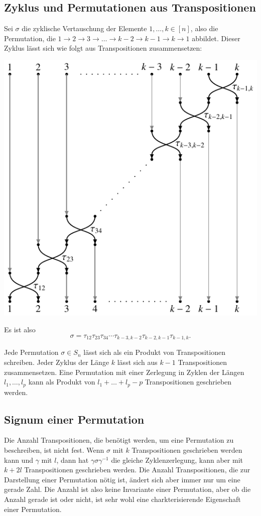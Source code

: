 \subsection{Zyklus und Permutationen aus Transpositionen}
Sei $\sigma$ die zyklische Vertauschung der Elemente $1,\dots,k\in [n]$,
also die Permutation, die $1\to2\to3\to\dots\to k-2\to k-1\to k\to 1$
abbildet.
Dieser Zyklus lässt sich wie folgt aus Transpositionen zusammensetzen:
\begin{center}
\includegraphics{chapters/50-permutationen/images/transpositionen.pdf}
\end{center}
Es ist also
\[
\sigma 
=
\tau_{12} \tau_{23} \tau_{34} \cdots \tau_{k-3,k-2} \tau_{k-2,k-1} \tau_{k-1,k}.
\]
\begin{satz}
Jede Permutation $\sigma\in S_n$ lässt sich als ein Produkt von 
Transpositionen schreiben.
Jeder Zyklus der Länge $k$ lässt sich aus $k-1$ Transpositionen
zusammensetzen.
Eine Permutation mit einer Zerlegung in Zyklen der Längen $l_1,\dots,l_p$
kann als Produkt von $l_1+\dots+l_p-p$ Transpositionen geschrieben werden.
\end{satz}

\subsection{Signum einer Permutation}
Die Anzahl Transpositionen, die benötigt werden, um eine Permutation
zu beschreiben, ist nicht fest. 
Wenn $\sigma$ mit $k$ Transpositionen geschrieben werden kann und
$\gamma$ mit $l$, dann hat $\gamma\sigma\gamma^{-1}$ die gleiche
Zyklenzerlegung, kann aber mit $k+2l$ Transpositionen geschrieben
werden.
Die Anzahl Transpositionen, die zur Darstellung einer Permutation
nötig ist, ändert sich aber immer nur um eine gerade Zahl.
Die Anzahl ist also keine Invariante einer Permutation, aber ob
die Anzahl gerade ist oder nicht, ist sehr wohl eine charkterisierende
Eigenschaft einer Permutation.

